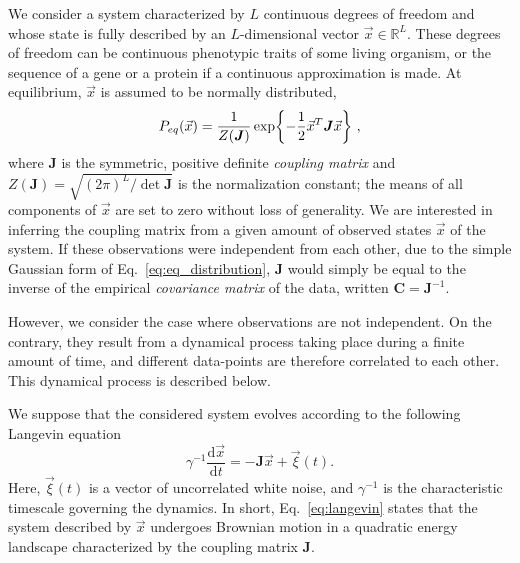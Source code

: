 \documentclass[preprint,amsmath,amssymb,superscriptaddress,showpacs,pre]{revtex4-1}
\let\originalleft\left
\let\originalright\right
\renewcommand{\left}{\mathopen{}\mathclose\bgroup\originalleft}
\renewcommand{\right}{\aftergroup\egroup\originalright}
\def\vx{\vec x}
\newcommand{\curlynormal}[1]{\exp\left\{-\frac{1}{2} #1 \right\}}
\begin{document}
We consider a system characterized by $L$ continuous degrees of freedom and whose state is fully described by an $L$-dimensional vector $\vx\in\mathbb{R}^L$. These degrees of freedom can be continuous phenotypic traits of some living organism, or the sequence of a gene or a protein if a continuous approximation is made. 
At equilibrium, $\vx$ is assumed to be normally distributed,
\begin{equation}
	P_{eq}(\vx) = \frac{1}{Z(\bm{J})}\curlynormal{\vx^T\bm{J}\vx}\ ,
	\label{eq:eq_distribution}
\end{equation}
where $\bm{J}$ is the symmetric, positive definite \emph{coupling matrix} and $Z(\bm{J}) = \sqrt{(2\pi)^L/\det \bm{J}}$ is the normalization constant; the means of all components of $\vx$ are set to zero without loss of generality. 
We are interested in inferring the coupling matrix from a given amount of observed states $\vx$ of the system.
If these observations were independent from each other, due to the simple Gaussian form of Eq.~\eqref{eq:eq_distribution}, $\bm{J}$ would simply be equal to the inverse of the empirical \emph{covariance matrix} of the data, written $\bm{C}=\bm{J}^{-1}$. 

However, we consider the case where observations are not independent. 
On the contrary, they result from a dynamical process taking place during a finite amount of time, and different data-points are therefore correlated to each other.
This dynamical process is described below.

We suppose that the considered system evolves according to the following Langevin equation 
\begin{equation}
	\gamma^{-1}\frac{\text{d}\vx}{\text{d}t} = - \bm{J}\vx + \vec{\xi}(t).
	\label{eq:langevin}
\end{equation}
Here, $\vec{\xi}(t)$ is a vector of uncorrelated white noise, and $\gamma^{-1}$ is the characteristic timescale governing the dynamics. 
In short, Eq.~\eqref{eq:langevin} states that the system described by $\vx$ undergoes Brownian motion in a quadratic energy landscape characterized by the coupling matrix $\bm{J}$. 
\end{document}
